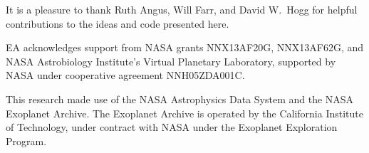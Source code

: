 \documentclass[manuscript, letterpaper]{aastex6}
\newcommand{\project}[1]{\textsf{#1}}
\begin{document}
%
%

\acknowledgments
It is a pleasure to thank
Ruth Angus,
Will Farr,
and
David W.\ Hogg
for helpful contributions to the ideas and code presented here.

EA acknowledges support from NASA grants NNX13AF20G, NNX13AF62G, and
NASA Astrobiology Institute's Virtual Planetary Laboratory, supported
by NASA under cooperative agreement NNH05ZDA001C.

This research made use of the NASA \project{Astrophysics Data System} and the
NASA Exoplanet Archive.
The Exoplanet Archive is operated by the California Institute of Technology,
under contract with NASA under the Exoplanet Exploration Program.
\end{document}
